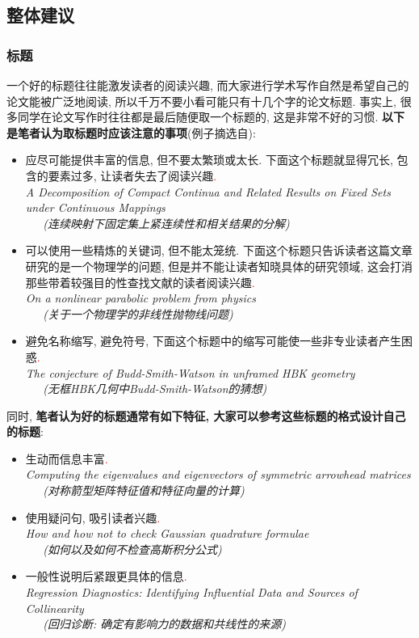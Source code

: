 \documentclass{formatBook}
\newcommand{\XG}[1]{\textcolor{red}{#1}}
\begin{document}
\subsection{整体建议}
\subsubsection{标题}
一个好的标题往往能激发读者的阅读兴趣, 而大家进行学术写作自然是希望自己的论文能被广泛地阅读, 所以千万不要小看可能只有十几个字的论文标题. 事实上, 很多同学在论文写作时往往都是最后随便取一个标题的, 这是非常不好的习惯. \textbf{以下是笔者认为取标题时应该注意的事项}(例子摘选自\cite{JungelHow}):
\begin{itemize}
    \item 应尽可能提供丰富的信息, 但不要太繁琐或太长. 下面这个标题就显得冗长, 包含的要素过多, 让读者失去了阅读兴趣\XG{.}\\
          \textit{A Decomposition of Compact Continua and Related Results on Fixed Sets under Continuous Mappings \\ \ \ \  (连续映射下固定集上紧连续性和相关结果的分解)}
    \item 可以使用一些精炼的关键词, 但不能太笼统. 下面这个标题只告诉读者这篇文章研究的是一个物理学的问题, 但是并不能让读者知晓具体的研究领域, 这会打消那些带着较强目的性查找文献的读者阅读兴趣\XG{.}\\
          \textit{On a nonlinear parabolic problem from physics \\ \ \ \  (关于一个物理学的非线性抛物线问题)}
    \item 避免名称缩写, 避免符号, 下面这个标题中的缩写可能使一些非专业读者产生困惑\XG{.}\\
          \textit{The conjecture of Budd-Smith-Watson in unframed HBK geometry  \\ \ \ \ (无框HBK几何中Budd-Smith-Watson的猜想)}
\end{itemize}
\par
同时, \textbf{笔者认为好的标题通常有如下特征, 大家可以参考这些标题的格式设计自己的标题}:
\begin{itemize}
    \item 生动而信息丰富\XG{.}\\
          \textit{Computing the eigenvalues and eigenvectors of symmetric arrowhead matrices \\ \ \ \ (对称箭型矩阵特征值和特征向量的计算)}
    \item 使用疑问句, 吸引读者兴趣\XG{.}\\
          \textit{How and how not to check Gaussian quadrature formulae \\ \ \ \ (如何以及如何不检查高斯积分公式)}
    \item 一般性说明后紧跟更具体的信息\XG{.}\\
          \textit{Regression Diagnostics: Identifying Influential Data and Sources of Collinearity \\  \ \ \
              (回归诊断: 确定有影响力的数据和共线性的来源)}
\end{itemize}
\end{document}
